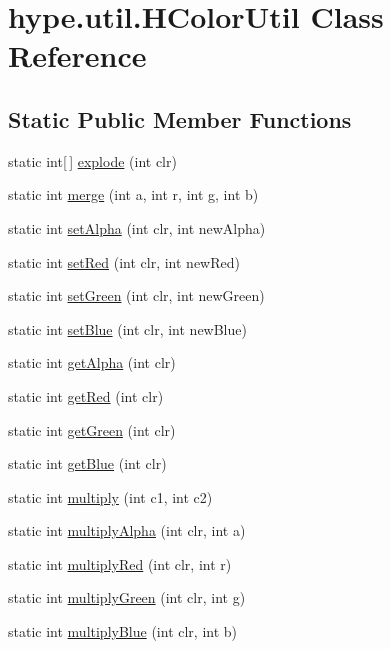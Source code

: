 \hypertarget{classhype_1_1util_1_1_h_color_util}{\section{hype.\-util.\-H\-Color\-Util Class Reference}
\label{classhype_1_1util_1_1_h_color_util}
}
\subsection*{Static Public Member Functions}
\begin{DoxyCompactItemize}
\item 
static int\mbox{[}$\,$\mbox{]} \hyperlink{classhype_1_1util_1_1_h_color_util_a61666a2832863a3868acca5ae680b3e8}{explode} (int clr)
\item 
static int \hyperlink{classhype_1_1util_1_1_h_color_util_aaf8e880d254f071d6ab8cf91f016760d}{merge} (int a, int r, int g, int b)
\item 
static int \hyperlink{classhype_1_1util_1_1_h_color_util_add8fde8a6ae35478d2aea48df979fc12}{set\-Alpha} (int clr, int new\-Alpha)
\item 
static int \hyperlink{classhype_1_1util_1_1_h_color_util_a77c1dc20114fbf56c2bb014bf190686a}{set\-Red} (int clr, int new\-Red)
\item 
static int \hyperlink{classhype_1_1util_1_1_h_color_util_aabc476d0e464877a18bb5ee4a751bf48}{set\-Green} (int clr, int new\-Green)
\item 
static int \hyperlink{classhype_1_1util_1_1_h_color_util_a0f375222383f9687772b41ea22f2a965}{set\-Blue} (int clr, int new\-Blue)
\item 
static int \hyperlink{classhype_1_1util_1_1_h_color_util_a62367754c43ab53594f1b6d0625e660f}{get\-Alpha} (int clr)
\item 
static int \hyperlink{classhype_1_1util_1_1_h_color_util_a64a78dccd1abb4fa012cdf5d0c50b56d}{get\-Red} (int clr)
\item 
static int \hyperlink{classhype_1_1util_1_1_h_color_util_af700fdfd05f52003a8d7504b32b4c9db}{get\-Green} (int clr)
\item 
static int \hyperlink{classhype_1_1util_1_1_h_color_util_a123758fac5ad0a8ec72f9964e54d0131}{get\-Blue} (int clr)
\item 
static int \hyperlink{classhype_1_1util_1_1_h_color_util_aeba45bdca8e3e4af799a7f815e76b104}{multiply} (int c1, int c2)
\item 
static int \hyperlink{classhype_1_1util_1_1_h_color_util_a0c5ce9ff0ff3fb67cf0d7169053b26bb}{multiply\-Alpha} (int clr, int a)
\item 
static int \hyperlink{classhype_1_1util_1_1_h_color_util_a2ff3708269568ca182fdeace71f81d66}{multiply\-Red} (int clr, int r)
\item 
static int \hyperlink{classhype_1_1util_1_1_h_color_util_ab540175a91fb8e570f835a4178abf726}{multiply\-Green} (int clr, int g)
\item 
static int \hyperlink{classhype_1_1util_1_1_h_color_util_aebc7cc6aa38851ccce260831942573ef}{multiply\-Blue} (int clr, int b)
\end{DoxyCompactItemize}


